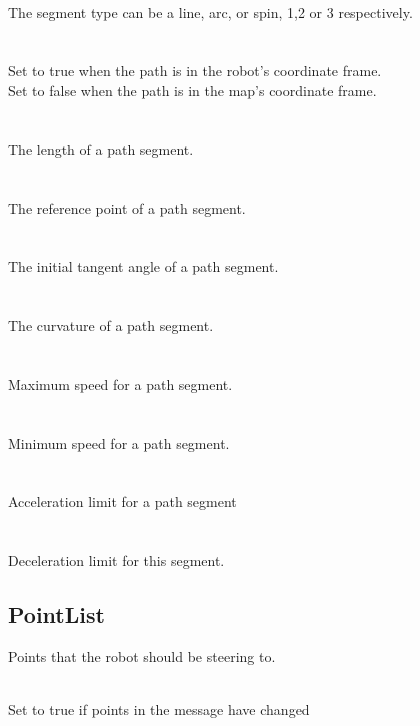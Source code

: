 \\
\indent The segment type can be a line, arc, or spin, 1,2 or 3 respectively.\\
\\
\\
\indent Set to true when the path is in the robot's coordinate frame.\\
\indent Set to false when the path is in the map's coordinate frame.\\
\\
\\
\indent The length of a path segment.\\
\\
\\
\indent The reference point of a path segment.\\
\\
\\
\indent The initial tangent angle of a path segment.\\
\\
\\
\indent The curvature of a path segment.\\
\\
\\
\indent Maximum speed for a path segment.\\
\\
\\
\indent Minimum speed for a path segment.\\
\\
\\
\indent Acceleration limit for a path segment \\
\\
\\
\indent Deceleration limit for this segment.\\

\subsection{PointList}
Points that the robot should be steering to.

\\
\indent Set to true if points in the message have changed\\


